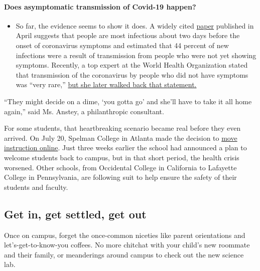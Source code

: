\begin{itemize}
{  \paragraph{Does asymptomatic transmission of Covid-19
  happen?}\label{does-asymptomatic-transmission-of-covid-19-happen}}

  \begin{itemize}
  \tightlist
  \item
    So far, the evidence seems to show it does. A widely cited
    \href{https://www.nature.com/articles/s41591-020-0869-5}{paper}
    published in April suggests that people are most infectious about
    two days before the onset of coronavirus symptoms and estimated that
    44 percent of new infections were a result of transmission from
    people who were not yet showing symptoms. Recently, a top expert at
    the World Health Organization stated that transmission of the
    coronavirus by people who did not have symptoms was ``very rare,''
    \href{https://www.nytimes.com/2020/06/09/world/coronavirus-updates.html?action=click\&pgtype=Article\&state=default\&region=MAIN_CONTENT_3\&context=storylines_faq\#link-1f302e21}{but
    she later walked back that statement.}
  \end{itemize}
\end{itemize}

``They might decide on a dime, `you gotta go' and she'll have to take it
all home again,'' said Ms. Anstey, a philanthropic consultant.

For some students, that heartbreaking scenario became real before they
even arrived. On July 20, Spelman College in Atlanta made the decision
to \href{https://www.spelman.edu/academics/path-forward-2020-21}{move
instruction online}. Just three weeks earlier the school had announced a
plan to welcome students back to campus, but in that short period, the
health crisis worsened. Other schools, from Occidental College in
California to Lafayette College in Pennsylvania, are following suit to
help ensure the safety of their students and faculty.

\hypertarget{get-in-get-settled-get-out}{%
\subsection{Get in, get settled, get
out}\label{get-in-get-settled-get-out}}

Once on campus, forget the once-common niceties like parent orientations
and let's-get-to-know-you coffees. No more chitchat with your child's
new roommate and their family, or meanderings around campus to check out
the new science lab.


